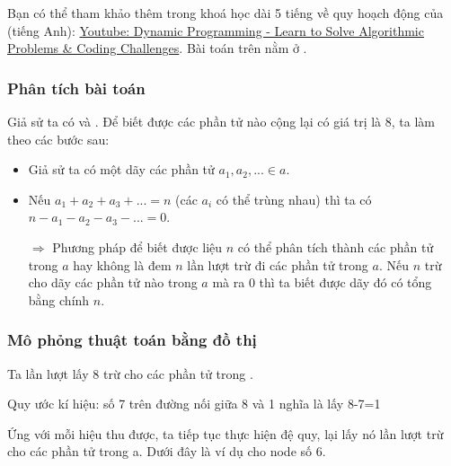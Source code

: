 \documentclass[main.tex]{subfiles}
\begin{document}
Bạn có thể tham khảo thêm trong khoá học dài 5 tiếng về quy hoạch động của  (tiếng Anh): \href{https://www.youtube.com/watch?v=oBt53YbR9Kk}{Youtube: Dynamic Programming - Learn to Solve Algorithmic Problems \& Coding Challenges}. Bài toán trên nằm ở .

\subsubsection{Phân tích bài toán}
Giả sử ta có  và . Để biết được các phần tử nào cộng lại có giá trị là 8, ta làm theo các bước sau:
\begin{itemize}
    \item Giả sử ta có một dãy các phần tử $a_1, a_2, ... \in a$.
    \item Nếu $a_1+a_2+a_3+...=n$ (các $a_i$ có thể trùng nhau) thì ta có $n-a_1-a_2-a_3-...=0$.\par
    $\Rightarrow$ Phương pháp để biết được liệu $n$ có thể phân tích thành các phần tử trong $a$ hay không là đem $n$ lần lượt trừ đi các phần tử trong $a$. Nếu $n$ trừ cho dãy các phần tử nào trong $a$ mà ra $0$ thì ta biết được dãy đó có tổng bằng chính $n$.
\end{itemize}

\subsubsection{Mô phỏng thuật toán bằng đồ thị}
Ta lần lượt lấy 8 trừ cho các phần tử trong .

\begin{center}
\par Quy ước kí hiệu: số 7 trên đường nối giữa 8 và 1 nghĩa là lấy 8-7=1
\end{center}

Ứng với mỗi hiệu thu được, ta tiếp tục thực hiện đệ quy, lại lấy nó lần lượt  trừ cho các phần tử trong \code a. Dưới đây là ví dụ cho node số 6.

\begin{center}
\end{center}
\end{document}
